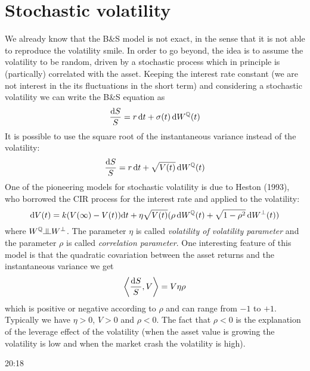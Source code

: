 \section{Stochastic volatility}
We already know that the B\&S model is not exact, in the sense that it is not able to reproduce the volatility smile. In order to go beyond, the idea is to assume the volatility to be random, driven by a stochastic process which in principle is (partically) correlated with the asset. Keeping the interest rate constant (we are not interest in the its fluctuations in the short term) and considering a stochastic volatility we can write the B\&S equation as
\begin{equation}
    \frac{\dd S}{S} = r\,\dd t + \sigma(t)\,\dd W^{\mathbb{Q}}(t)
\end{equation}
It is possible to use the square root of the instantaneous variance instead of the volatility:
\begin{equation}
    \frac{\dd S}{S} = r\,\dd t + \sqrt{V(t)}\,\dd W^{\mathbb{Q}}(t)
\end{equation}
One of the pioneering models for stochastic volatility is due to Heston (1993), who borrowed the CIR process for the interest rate and applied to the volatility:
\begin{equation}
    \dd V(t) = k(V(\infty)-V(t))\dd t + \eta\sqrt{V(t)}(\rho\,\dd W^{\mathbb{Q}}(t) + \sqrt{1-\rho^2}\,\dd W^{\perp}(t))
\end{equation}%
where $W^{\Qmeas}\indep W^{\perp}$. The parameter $\eta$ is called \emph{volatility of volatility parameter} and the parameter $\rho$ is called \emph{correlation parameter}. One interesting feature of this model is that the quadratic covariation between the asset returns and the instantaneous variance we get
\begin{equation*}
    \expval{\frac{\dd S}{S}, V} = V\eta\rho
\end{equation*}
which is positive or negative according to $\rho$ and can range from $-1$ to $+1$. Typically we have $\eta>0$, $V>0$ and $\rho<0$. The fact that $\rho<0$ is the explanation of the leverage effect of the volatility (when the asset value is growing the volatility is low and when the market crash the volatility is high).

20:18
